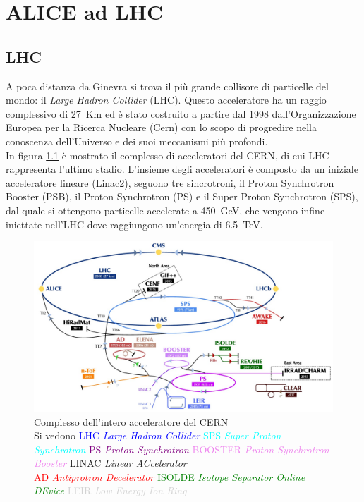 \chapter{ALICE ad LHC}

\section{LHC}
A poca distanza da Ginevra si trova il più grande collisore di particelle del mondo: il \textit{Large Hadron Collider} (LHC). Questo acceleratore ha un raggio complessivo di 27~Km ed è stato costruito a partire dal 1998 dall'Organizzazione Europea per la Ricerca Nucleare (Cern) con lo scopo di progredire nella conoscenza dell'Universo e dei suoi meccanismi più profondi.
\\In figura \ref{fig:CERNcomplex} è mostrato il complesso di acceleratori del CERN, di cui LHC rappresenta l'ultimo stadio. L'insieme degli acceleratori \`e composto da un iniziale acceleratore lineare (Linac2), seguono tre sincrotroni, il Proton Synchrotron Booster (PSB), il Proton Synchrotron (PS) e il Super Proton Synchrotron (SPS), dal quale si ottengono particelle accelerate a 450~GeV, che vengono infine iniettate nell'LHC dove raggiungono un'energia di 6.5~TeV. 
 
    \begin{figure}[htbp]
        \centering
        \includegraphics[width=0.8\linewidth]{ALICE/CernComplex_2018.png}   
        \caption{Complesso dell'intero acceleratore del CERN \\\small{Si vedono  \textcolor{blue}{LHC \textit{Large Hadron Collider}} \textcolor{cyan}{SPS \textit{Super Proton Synchrotron}} \textcolor{purple}{ PS \textit{Proton Synchrotron}} \textcolor{violet}{BOOSTER \textit{Proton Synchrotron Booster}} LINAC \textit{Linear ACcelerator}} \\{\footnotesize  \textcolor{red}{AD \textit{Antiprotron Decelerator}} \textcolor{green}{ISOLDE \textit{Isotope Separator Online DEvice}}  \textcolor{lightgray}{LEIR \textit{Low Energy Ion Ring}} }}
        \label{fig:CERNcomplex}
    \end{figure}
    
